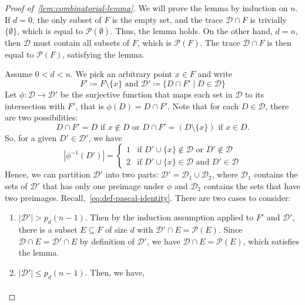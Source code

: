 \begin{proof}[Proof of~\ref{lem:combinatorial-lemma}]

    We will prove the lemma by induction on $n$. If $d=0$, the only subset of $F$ is the empty set, and the trace $\mathcal{D} \cap F$ is trivially $\{\emptyset\}$, which is equal to $\mathcal{P}(\emptyset)$. Thus, the lemma holds. On the other hand, $d = n$, then $\mathcal{D}$ must contain all subsets of $F$, which is $\mathcal{P}(F)$. The trace $\mathcal{D} \cap F$ is then equal to $\mathcal{P}(F)$, satisfying the lemma.

    Assume $0 < d < n$. We pick an arbitrary point $x \in F$ and write
    \[
        F' \coloneq F \setminus \{x\} \textrm{ and } \mathcal{D}' \coloneq \{D \cap F' \mid D \in \mathcal{D}\}
    \]
    Let $\phi: \mathcal{D} \to \mathcal{D}'$ be the surjective function that maps each set in $\mathcal{D}$ to its intersection with $F'$, that is $\phi(D) = D \cap F'$. Note that for each $D \in \mathcal{D}$, there are two possibilities:
    \[
        D \cap F' = D \text{ if } x \notin D  \textrm{  or  }  D \cap F' = (D \setminus \{x\}) \text{ if } x \in D.
    \]
    So, for a given $D' \in \mathcal{D'}$, we have
    \[
        |\phi^{-1}(D')| = \begin{cases}
                              1 & \text{if } D' \cup \{x\} \notin \mathcal{D} \textrm{ or } D' \notin \mathcal{D} \\
                              2 & \text{if } D' \cup \{x\} \in \mathcal{D} \textrm{ and } D' \in \mathcal{D}
        \end{cases}
    \]
    Hence, we can partition $\mathcal{D}'$ into two parts: $\mathcal{D}' = \mathcal{D}_1 \cup \mathcal{D}_2$, where $\mathcal{D}_1$ contains the sets of $\mathcal{D}'$ that has only one preimage under $\phi$ and $\mathcal{D}_2$ contains the sets that have two preimages.
    Recall,~\ref{eq:def-pascal-identity}. There are two cases to consider:
    \begin{enumerate}[label=(\roman*)]
        \item $|\mathcal{D}'| > p_d(n-1)$. Then by the induction assumption applied to $F'$ and $\mathcal{D}'$, there is a subset $E \subseteq F$ of size $d$ with $\mathcal{D}' \cap E = \mathcal{P}(E)$. Since $\mathcal{D} \cap E = \mathcal{D}' \cap E$ by definition of $\mathcal{D}'$, we have $\mathcal{D} \cap E = \mathcal{P}(E)$, which satisfies the lemma.
        \item $|\mathcal{D}'| \leq p_d(n-1)$. Then, we have,
        \[
            \begin{aligned}

\end{aligned}\]
\end{enumerate}
\end{proof}
